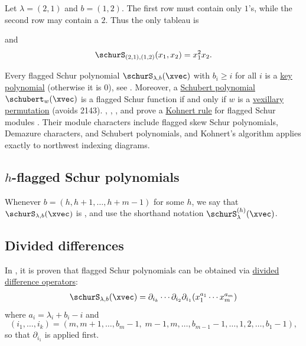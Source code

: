 \begin{example}
Let $\lambda=(2,1)$ and $b=(1,2)$.
The first row must contain only $1$'s, while the second row may contain a $2$.
Thus the only tableau is
\begin{figure}
\end{figure}
and
\[
 \schurS_{(2,1),(1,2)}(x_1,x_2)=x_1^2x_2.
\]
\end{example}

Every flagged Schur polynomial $\schurS_{\lambda,b}(\xvec)$ with $b_i \geq i$ for all $i$ is a \hyperref[key]{key polynomial} (otherwise it is $0$),
see \cite[Thm.~23]{ReinerShimozono1995}.
Moreover, a \hyperref[schubert]{Schubert polynomial} $\schubert_w(\xvec)$ is a flagged Schur function
if and only if $w$ is a \hyperref[vexillary]{vexillary permutation} (avoids 2143).
, , , and
 prove a \hyperref[kohnert]{Kohnert rule} for flagged
Schur modules \cite{ArmonAssafBowlingEhrhard2023}.  Their module characters
include flagged skew Schur polynomials, Demazure characters, and Schubert
polynomials, and Kohnert's algorithm applies exactly to northwest indexing
diagrams.


\subsection[hFlaggedSchurPolynomials]{$h$-flagged Schur polynomials}

Whenever $b = (h,h+1,\dotsc,h+m-1)$ for some $h$, we say that
$\schurS_{\lambda,b}(\xvec)$
is \label{hFlaggedSchurDefinition}, and use the shorthand
notation $\schurS^{(h)}_{\lambda}(\xvec)$.

\subsection[flaggedSchurDividedDifferences]{Divided differences}

In \cite{Wachs1985}, it is proven that flagged Schur polynomials can
be obtained via \hyperref[schubertOperatorformula]{divided difference operators}:
\begin{align*}
\schurS_{\lambda,b}(\xvec) = \partial_{i_k} \dotsm \partial_{i_2} \partial_{i_1}( x_1^{a_1} \dotsm x_m^{a_m})
\end{align*}
where $a_i = \lambda_i + b_i -i$ and
\[
(i_1,\dotsc,i_k) = (m,m+1,\dotsc, b_m-1,\;  m-1,m,\dotsc, b_{m-1} - 1, \dotsc, 1,2,\dotsc, b_1 -1 ),
\]
so that $\partial_{i_1}$ is applied first.



